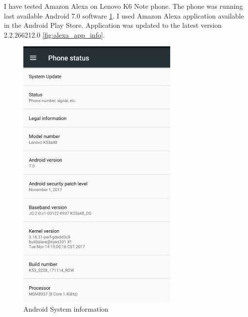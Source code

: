 \documentclass[
  digital, %
  oneside, %
  table,   %
  lof,     %
  lot,     %
]{fithesis3}
\begin{document}
I have tested Amazon Alexa on Lenovo K6 Note phone. The phone was running last available Android 7.0 software \ref{fig:android_info}. I used Amazon Alexa application available in the Android Play Store. Application was updated to the latest version 2.2.266212.0 \ref{fig:alexa_app_info}.

\begin{figure}[H]
  \begin{center}
    \includegraphics[width=8cm]{pictures/android_info[1].jpeg}
  \end{center}
  \caption{Android System information}
  \label{fig:android_info}
\end{figure}
\end{document}
